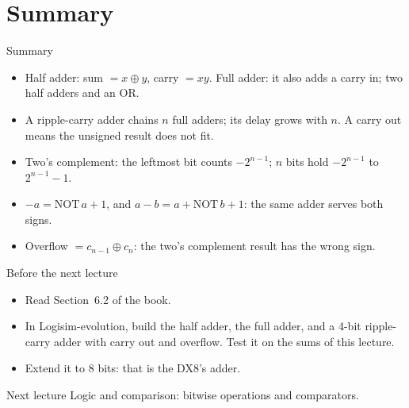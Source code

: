 \documentclass[10pt]{wosm-slides}
\begin{document}
\section{Summary}

\begin{frame}{Summary}
  \begin{itemize}
    \item Half adder: sum $= x \oplus y$, carry $= x y$. Full adder: it also adds a
      carry in; two half adders and an OR.
    \item A ripple-carry adder chains $n$ full adders; its delay grows with $n$.
      A carry out means the unsigned result does not fit.
    \item Two's complement: the leftmost bit counts $-2^{n-1}$; $n$ bits hold
      $-2^{n-1}$ to $2^{n-1} - 1$.
    \item $-a = \mathrm{NOT}\,a + 1$, and $a - b = a + \mathrm{NOT}\,b + 1$: the same
      adder serves both signs.
    \item Overflow $= c_{n-1} \oplus c_n$: the two's complement result has the wrong
      sign.
  \end{itemize}
\end{frame}

\begin{frame}{Before the next lecture}
  \begin{itemize}
    \item Read Section~6.2 of the book.
    \item In Logisim-evolution, build the half adder, the full adder, and a 4-bit
      ripple-carry adder with carry out and overflow. Test it on the sums of this
      lecture.
    \item Extend it to 8 bits: that is the DX8's adder.
  \end{itemize}

  \begin{block}{Next lecture }
    Logic and comparison: bitwise operations and comparators.
  \end{block}
\end{frame}
\end{document}
